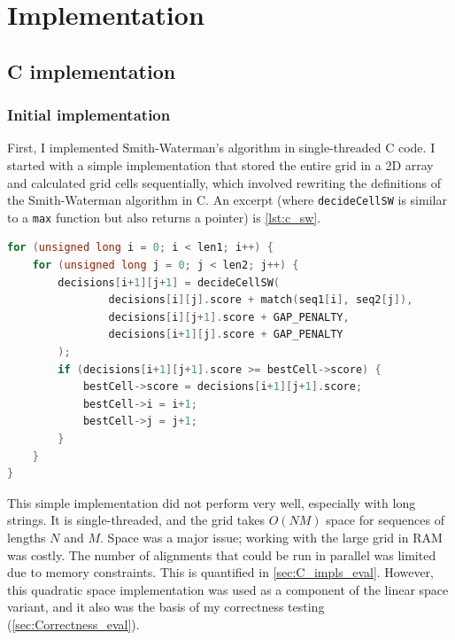 
\chapter{Implementation}

\section{C implementation}
\label{sec:C_impl}

\subsection{Initial implementation}
\label{sec:Initial_C_impl}

First, I implemented Smith-Waterman’s algorithm in single-threaded C code.
I started with a simple implementation that stored the entire grid in a 2D array and calculated grid cells sequentially, which involved rewriting the definitions of the Smith-Waterman algorithm in C.
An excerpt (where \lstinline{decideCellSW} is similar to a \lstinline{max} function but also returns a pointer) is \cref{lst:c_sw}.

\begin{lstlisting}[language=C,float,basicstyle=\linespread{0.9}\ttfamily\footnotesize, label={lst:c_sw},captionpos=b,caption={Excerpt from C implementation of Smith-Waterman algorithm}]
for (unsigned long i = 0; i < len1; i++) {
    for (unsigned long j = 0; j < len2; j++) {
        decisions[i+1][j+1] = decideCellSW(
                decisions[i][j].score + match(seq1[i], seq2[j]),
                decisions[i][j+1].score + GAP_PENALTY,
                decisions[i+1][j].score + GAP_PENALTY
        );
        if (decisions[i+1][j+1].score >= bestCell->score) {
            bestCell->score = decisions[i+1][j+1].score;
            bestCell->i = i+1;
            bestCell->j = j+1;
        }
    }
}
\end{lstlisting}
This simple implementation did not perform very well, especially with long strings.
It is single-threaded, and the grid takes $O(NM)$ space for sequences of lengths $N$ and $M$.
Space was a major issue; working with the large grid in RAM was costly.
The number of alignments that could be run in parallel was limited due to memory constraints.
This is quantified in \cref{sec:C_impls_eval}.
However, this quadratic space implementation was used as a component of the linear space variant, and it also was the basis of my correctness testing (\cref{sec:Correctness_eval}).

